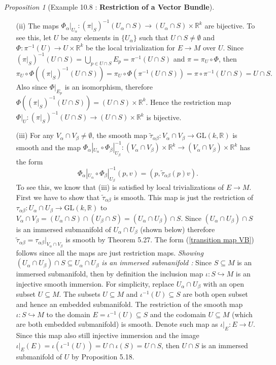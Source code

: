 \documentclass[a4paper]{article}
\theoremstyle{remark}
\newtheorem{prop}{Proposition}
\newcommand{\er}{\mathbb{R}} %
\newcommand{\rk}{\mathbb{R}^k} %
\newcommand{\subhim}{\subseteq} %
\newcommand{\GLsaja}{\text{GL}} %
\begin{document}
\begin{prop}[Example 10.8 : \textbf{Restriction of a Vector Bundle}]
\begin{enumerate}[nolistsep]
\item[(ii)] The maps $\Phi_{\alpha}|_{U_{\alpha}} : (\pi|_S)^{-1}(U_{\alpha} \cap S) \to (U_{\alpha} \cap S) \times \rk$ are bijective. To see this, let $U$ be any elements in $\{U_{\alpha}\}$ such that $U \cap S \neq \emptyset$ and $\Phi : \pi^{-1}(U) \to U \times \rk$ be the local trivialization for $E\to M$ over $U$. Since $(\pi|_S)^{-1}(U \cap S) = \bigcup_{p \in U \cap S} E_p = \pi^{-1}(U \cap S)$ and $\pi = \pi_U \circ \Phi$, then
$$
\pi_U \circ \Phi ((\pi|_S)^{-1}(U \cap S)) = \pi_U \circ \Phi (\pi^{-1}(U \cap S)) = \pi \circ \pi^{-1}(U \cap S) = U \cap S.
$$
Also since $\Phi|_{E_p}$ is an isomorphism, therefore $\Phi ((\pi|_S)^{-1}(U \cap S)) = (U\cap S) \times \rk$. Hence the restriction map $\Phi|_{U} : (\pi|_S)^{-1}(U \cap S) \to (U\cap S) \times \rk$ is bijective.
\item[(iii)] For any $V_{\alpha} \cap V_{\beta} \neq \emptyset$, the smooth map $\widetilde{\tau}_{\alpha \beta} : V_{\alpha} \cap V_{\beta} \to \GLsaja(k,\er)$ is smooth and the map $\Phi_{\alpha}|_{U_{\alpha}} \circ \Phi_{\beta}|_{U_{\beta}}^{-1} : (V_{\alpha} \cap V_{\beta})\times \rk \to (V_{\alpha} \cap V_{\beta})\times \rk$ has the form
\begin{equation}\label{transition map VB}\tag{$\star$}
\Phi_{\alpha}|_{U_{\alpha}} \circ \Phi_{\beta}|_{U_{\beta}}^{-1} (p,v) = (p, \widetilde{\tau}_{\alpha \beta} (p) v).
\end{equation}
To see this, we know that (iii) is satisfied by local trivializations of $E \to M$. First we have to show that $\widetilde{\tau}_{\alpha \beta}$ is smooth. This map is just the restriction of $\tau_{\alpha\beta} : U_{\alpha} \cap U_\beta \to \GLsaja(k ,\er)$ to $V_{\alpha} \cap V_{\beta} = (U_{\alpha} \cap S) \cap (U_{\beta} \cap S) = ( U_{\alpha} \cap U_\beta) \cap S$. Since $( U_{\alpha} \cap U_\beta) \cap S$ is an immersed submanifold of $U_{\alpha} \cap U_\beta$ (shown below) therefore $\widetilde{\tau}_{\alpha \beta} = \tau_{\alpha \beta}|_{V_{\alpha} \cap V_{\beta}}$ is smooth by Theorem 5.27. The form (\ref{transition map VB}) follows since all the maps are just restriction maps. \textit{Showing $( U_{\alpha} \cap U_\beta) \cap S \subhim  U_{\alpha} \cap U_\beta$ is an immersed submanifold :} Since $S \subhim M$ is an immersed submanifold, then by definition the inclusion map $\iota : S \hookrightarrow M$ is an injective smooth immersion. For simplicity, replace $U_{\alpha} \cap U_{\beta}$ with an open subset $U \subhim M$. The subsets $U \subhim M$ and $\iota^{-1}(U) \subhim S$ are both open subset and hence an embedded submanifold. The restriction of the smooth map $\iota : S \hookrightarrow M$ to the domain $E = \iota^{-1}(U) \subhim S$ and the codomain $U \subhim M$ (which are both embedded submanifold) is smooth. Denote such map as $\iota|_E : E \to U$. Since this map also still injective immersion and the image $\iota|_E (E) = \iota (\iota^{-1}(U)) = U \cap \iota(S) = U \cap S$, then $U \cap S $ is an immersed submanifold of $U$ by Proposition 5.18.
\end{enumerate}  
\end{prop}
\end{document}

